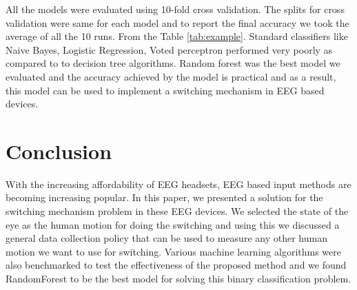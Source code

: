 \documentclass[10pt,twocolumn,letterpaper]{article}
\begin{document}
All the models were evaluated using 10-fold cross validation. The splits for cross validation were same for each model and to report the final accuracy we took the average of all the 10 runs. From the Table \ref{tab:example}. Standard classifiers like Naive Bayes, Logistic Regression, Voted perceptron performed very poorly as compared to to decision tree algorithms. Random forest was the best model we evaluated and the accuracy achieved by the model is practical and as a result, this model can be used to implement a switching mechanism in EEG based devices.

\section{Conclusion}

With the increasing affordability of EEG headsets, EEG based input methods are becoming increasing popular. In this paper, we presented a solution for the switching mechanism problem in these EEG devices. We selected the state of the eye as the human motion for doing the switching and using this we discussed a general data collection policy that can be used to measure any other human motion we want to use for switching. Various machine learning algorithms were also benchmarked to test the effectiveness of the proposed method and we found RandomForest to be the best model for solving this binary classification problem.

{\small


}
\end{document}
